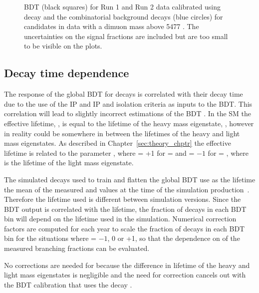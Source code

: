 \begin{figure}[htbp]
\begin{subfigure}[b]{0.48\textwidth}
   \end{subfigure}
    \caption{\bmumu BDT \pdfs (black squares) for Run 1 and Run 2 data calibrated using \bdkpi decay and the combinatorial background decays (blue circles) for \bmumu candidates in data with a dimuon mass above 5477 \mevcc. The uncertainties on the signal fractions are included but are too small to be visible on the plots. }
    \label{fig:BDTpdfs}
\end{figure}


\subsection{Decay time dependence}%
\label{sec:ADGBDTcorrections}
The response of the global BDT for \bmumu decays is correlated with their decay time due to the use of the \bs IP and IP \chisqd and isolation criteria as inputs to the BDT. This correlation will lead to slightly incorrect estimations of the \bsmumu BDT \pdf. In the SM the \bsmumu effective lifetime, \tmumu, is equal to the lifetime of the heavy \bs mass eigenstate, \tH, however in reality \tmumu could be somewhere in between the lifetimes of the heavy and light mass eigenstates. As described in Chapter~\ref{sec:theory_chptr} the \bsmumu effective lifetime is related to the parameter \ADG, where \ADG = +1 for \tmumu = \tH and \ADG = $-1$ for \tmumu = \tL, where \tL is the lifetime of the light \bsmumu mass eigenstate.

The simulated decays used to train and flatten the global BDT use as the \bsmumu lifetime the mean of the measured \tH and \tL values at the time of the simulation production~\cite{Olive:2016xmw}. Therefore the lifetime used is different between simulation versions. Since the BDT output is correlated with the lifetime, the fraction of \bsmumu decays in each BDT bin will depend on the lifetime used in the simulation. Numerical correction factors are computed for each year to scale the fraction of \bsmumu decays in each BDT bin for the situations where \ADF = $-1$, 0 or +1, so that the dependence on \ADG of the measured branching fractions can be evaluated.

No corrections are needed for \bdmumu because the difference in lifetime of the heavy and light \bd mass eigenstates is negligible and the need for correction cancels out with the BDT calibration that uses the \bd decay \bdkpi. 


